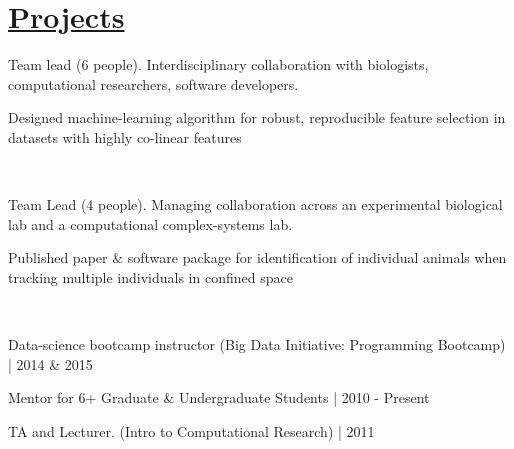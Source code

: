 \documentclass[]{winter-resume-openfont}
\begin{document}
\begin{minipage}[t]{0.65\textwidth}


\section{\underline{Projects}}

\vspace{\topsep}
\begin{tightemize}
\item Team lead (6 people). Interdisciplinary collaboration with biologists, computational researchers, software developers.
\item Designed machine-learning algorithm for robust, reproducible feature selection in datasets with highly co-linear features
\end{tightemize}

\vspace{\topsep} %

 \\
\begin{tightemize}
\item Team Lead (4 people). Managing collaboration across an experimental biological lab and a computational complex-systems lab.
\item  Published paper \& software package for identification of individual animals when tracking multiple individuals in confined space
\end{tightemize}

\sectionsep

 \\
\begin{tightemize}
\item Data-science bootcamp instructor (Big Data Initiative: Programming Bootcamp) | 2014 \& 2015
\item Mentor for 6+ Graduate \& Undergraduate Students | 2010 - Present
\item TA and Lecturer. (Intro to Computational Research) | 2011
\end{tightemize}


\end{minipage}
\end{document}
